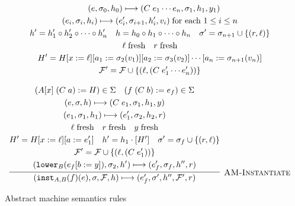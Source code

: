 \begin{figure}
{\[\begin{array}{c}
{\begin{gathered}
       ~~~ (e, \sigma_0, h_0) \step (C\; e_1 \cdots e_n, \sigma_1, h_1, y_1)
       \\  (e_i, \sigma_i, h_i) \step (e_i', \sigma_{i+1}, h_{i}', v_i)\; \textnormal{for each $1 \le i \le n$}
       \\ h' = h_1' \circ h_2' \circ \cdots \circ h_n'
       ~~~ h = h_0 \circ h_1 \circ \cdots \circ h_n
       ~~~ \sigma' = \sigma_{n+1} \cup \{ (r, \ell) \}
       \\  \freshLoc{\ell}
       ~~~ \freshVar{r}
       \\  H' = H[x := \ell][a_1 := \sigma_2(v_1)][a_2 := \sigma_3(v_2)]\cdots[a_n := \sigma_{n+1}(v_n)]
       \\  \mathcal{F}' = \mathcal{F} \cup \{ (\ell, (C\; e_1' \cdots e_n')) \}
     \end{gathered}
    }
  \\\\
  \labinfer[AM-Instantiate]{(\instantiateS{A,B}{f}(e), \sigma, \mathcal{F}, h) \step (e_f', \sigma', h'', \mathcal{F}', r)}
    {\begin{gathered}
        (A[x]\; (C\; a) := H) \in \Sigma
    ~~~ (f\; (C\; b) := e_f) \in \Sigma
    \\  (e, \sigma, h) \step (C\; e_1, \sigma_1, h_1, y)
    \\  (e_1, \sigma_1, h_1) \step (e_1', \sigma_2, h_2, r)
    \\ \freshLoc{\ell}
    ~~~ \freshVar{r}
      ~~~ \freshVar{y}
    \\  H' = H[x := \ell][a := e_1']
    ~~~  h' = h_1 \cdot [H']
    ~~~ \sigma' = \sigma_f \cup \{ (r, \ell) \}
    \\  \mathcal{F}' = \mathcal{F} \cup \{ (\ell, (C\; e_1')) \}
    \\  (\lowerS{B}{e_f[b := y]}, \sigma_2, h') \step (e_f', \sigma_f, h'', r)
     \end{gathered}
    }
\end{array}
\]
}


  \caption{Abstract machine semantics rules}
  \label{fig:abs-machine}
\end{figure}

